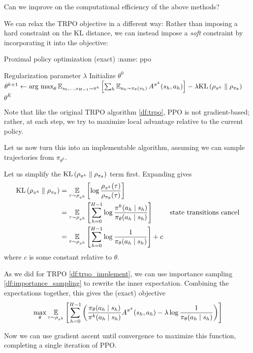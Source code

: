 \documentclass[\main/main]{subfiles}
\begin{document}
Can we improve on the computational efficiency of the above methods?


We can relax the TRPO objective in a different way: Rather than imposing a hard constraint on the KL distance, we can instead impose a \emph{soft} constraint by incorporating it into the objective:


\begin{definition}{Proximal policy optimization (exact)}
:name: ppo

    \begin{algorithmic}
        \Require Regularization parameter $\lambda$
        \State Initialize $\theta^0$
        \State $\theta^{k+1} \gets \operatorname*{\textrm{arg\ max}}_{\theta} \operatorname*{\mathbb{E}}_{s_0, \dots, s_{H-1} \sim \pi^k} \left[ \sum_h \operatorname*{\mathbb{E}}_{a_h \sim \pi_\theta(s_h)} A^{\pi^k}(s_h, a_h) \right] - \lambda \mathrm{KL}\left(\rho_{\pi^k} \parallel \rho_{\pi_{\theta}}\right)$
        \EndFor
        \State \Return $\theta^K$
    \end{algorithmic}

    Note that like the original TRPO algorithm \ref{df:trpo}, PPO is not gradient-based; rather, at each step, we try to maximize local advantage relative to the current policy.
\end{definition}

Let us now turn this into an implementable algorithm, assuming we can sample trajectories from $\pi_{\theta^k}$.


Let us simplify the $\mathrm{KL}\left(\rho_{\pi^k} \parallel \rho_{\pi_{\theta}}\right)$ term first. Expanding gives
\begin{align*}
    \mathrm{KL}\left(\rho_{\pi^k} \parallel \rho_{\pi_{\theta}}\right) & = \operatorname*{\mathbb{E}}_{\tau \sim \rho_{\pi^k}} \left[\log \frac{\rho_{\pi^k}(\tau)}{\rho_{\pi_{\theta}}(\tau)}\right]                                                       \\
                                           & = \operatorname*{\mathbb{E}}_{\tau \sim \rho_{\pi^k}} \left[ \sum_{h=0}^{H-1} \log \frac{\pi^k(a_h \mid s_h)}{\pi_{\theta}(a_h \mid s_h)}\right] & \text{state transitions cancel} \\
                                           & = \operatorname*{\mathbb{E}}_{\tau \sim \rho_{\pi^k}} \left[ \sum_{h=0}^{H-1} \log \frac{1}{\pi_{\theta}(a_h \mid s_h)}\right] + c
\end{align*}
where $c$ is some constant relative to $\theta$.

As we did for TRPO \eqref{df:trpo_implement}, we can use importance sampling \eqref{df:importance_sampling} to rewrite the inner expectation.
Combining the expectations together, this gives the (exact) objective
\[
    \max_{\theta} \operatorname*{\mathbb{E}}_{\tau \sim \rho_{\pi^k}} \left[ \sum_{h=0}^{H-1} \left( \frac{\pi_\theta(a_h \mid s_h)}{\pi^k(a_h \mid s_h)} A^{\pi^k}(s_h, a_h) - \lambda \log \frac{1}{\pi_\theta(a_h \mid s_h)} \right) \right]
\]

Now we can use gradient ascent until convergence to maximize this function, completing a single iteration of PPO.
\end{document}
